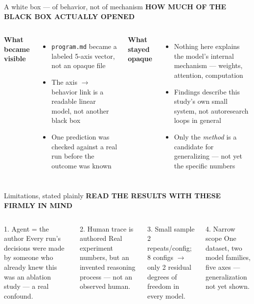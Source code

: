 \documentclass[aspectratio=169,11pt]{beamer}
\newcommand{\kicker}[1]{{\scriptsize\bfseries\color{accentDk}\MakeUppercase{#1}}\\[2pt]}
\begin{document}
{
\begin{frame}{A white box --- of behavior, not of mechanism}
\kicker{How much of the black box actually opened}
\begin{columns}[T,onlytextwidth]
{\bfseries\color{accent} What became visible}
\footnotesize
\begin{itemize}
\item \texttt{program.md} became a labeled 5-axis vector, not an opaque file
\item The axis $\to$ behavior link is a readable linear model, not another black box
\item One prediction was checked against a real run before the outcome was known
\end{itemize}
{\bfseries\color{mute!60!white} What stayed opaque}
\footnotesize
\begin{itemize}
\item Nothing here explains the model's internal mechanism --- weights, attention, computation
\item Findings describe this study's own small system, not autoresearch loops in general
\item Only the \emph{method} is a candidate for generalizing --- not yet the specific numbers
\end{itemize}
\end{columns}
\end{frame}
}

\begin{frame}{Limitations, stated plainly}
\kicker{Read the results with these firmly in mind}
\small
\begin{columns}[T,onlytextwidth]
\begin{block}{\footnotesize 1. Agent = the author}
\footnotesize Every run's decisions were made by someone who already knew this was an ablation study --- a real confound.
\end{block}
\vspace{2mm}
\begin{block}{\footnotesize 2. Human trace is authored}
\footnotesize Real experiment numbers, but an invented reasoning process --- not an observed human.
\end{block}
\begin{block}{\footnotesize 3. Small sample}
\footnotesize 2 repeats/config; 8 configs $\to$ only 2 residual degrees of freedom in every model.
\end{block}
\vspace{2mm}
\begin{block}{\footnotesize 4. Narrow scope}
\footnotesize One dataset, two model families, five axes --- generalization not yet shown.
\end{block}
\end{columns}
\end{frame}
\end{document}
